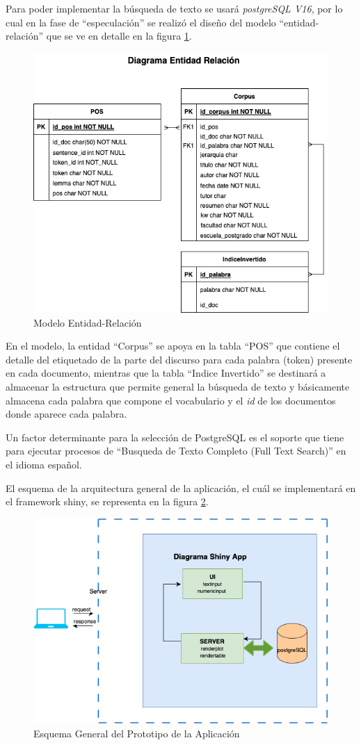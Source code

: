 \documentclass[
  12pt,
  openany]{book}
\begin{document}
Para poder implementar la búsqueda de texto se usará \emph{postgreSQL V16}, por lo cual en la fase de ``especulación'' se realizó el diseño del modelo ``entidad-relación'' que se ve en detalle en la figura \ref{fig:entrel}.

\begin{figure}

{\centering \includegraphics[width=0.6\linewidth]{images/05-desarrollo/2_ciclo/esquemas/diagrama_entidadrel} 

}

\caption{Modelo Entidad-Relación}\label{fig:entrel}
\end{figure}

En el modelo, la entidad ``Corpus'' se apoya en la tabla ``POS'' que contiene el detalle del etiquetado de la parte del discurso para cada palabra (token) presente en cada documento, mientras que la tabla ``Indice Invertido'' se destinará a almacenar la estructura que permite general la búsqueda de texto y básicamente almacena cada palabra que compone el vocabulario y el \emph{id} de los documentos donde aparece cada palabra.

Un factor determinante para la selección de PostgreSQL es el soporte que tiene para ejecutar procesos de ``Busqueda de Texto Completo (Full Text Search)'' en el idioma español.

El esquema de la arquitectura general de la aplicación, el cuál se implementará en el framework shiny, se representa en la figura \ref{fig:esqshinyproto}.

\begin{figure}

{\centering \includegraphics[width=0.5\linewidth]{images/05-desarrollo/2_ciclo/esquemas/shinyappproto} 

}

\caption{Esquema General del Prototipo de la Aplicación}\label{fig:esqshinyproto}
\end{figure}
\end{document}
